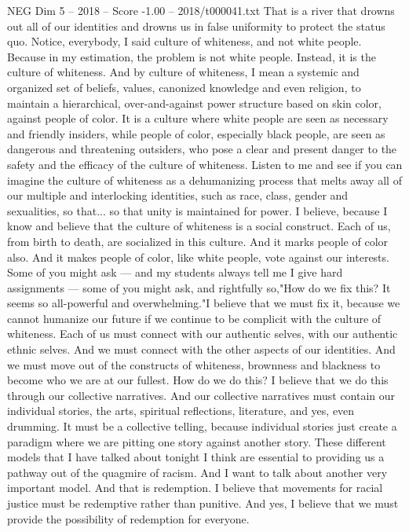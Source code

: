 \begin{textsample}{NEG Dim 5 – 2018 – Score -1.00 – 2018/t000041.txt}
That is a river that drowns out all of our identities and drowns us in false uniformity to protect the status quo.
Notice, everybody, I said culture of whiteness, and not white people.
Because in my estimation, the problem is not white people.
Instead, it is the culture of whiteness.
And by culture of whiteness, I mean a systemic and organized set of beliefs, values, canonized knowledge and even religion, to maintain a hierarchical, over-and-against power structure based on skin color, against people of color.
It is a culture where white people are seen as necessary and friendly insiders, while people of color, especially black people, are seen as dangerous and threatening outsiders, who pose a clear and present danger to the safety and the efficacy of the culture of whiteness.
Listen to me and see if you can imagine the culture of whiteness as a dehumanizing process that melts away all of our multiple and interlocking identities, such as race, class, gender and sexualities, so that... so that unity is maintained for power.
I believe, because I know and believe that the culture of whiteness is a social construct.
Each of us, from birth to death, are socialized in this culture.
And it marks people of color also.
And it makes people of color, like white people, vote against our interests.
Some of you might ask — and my students always tell me I give hard assignments — some of you might ask, and rightfully so,"How do we fix this?
It seems so all-powerful and overwhelming."I believe that we must fix it, because we cannot humanize our future if we continue to be complicit with the culture of whiteness.
Each of us must connect with our authentic selves, with our authentic ethnic selves.
And we must connect with the other aspects of our identities.
And we must move out of the constructs of whiteness, brownness and blackness to become who we are at our fullest.
How do we do this?
I believe that we do this through our collective narratives.
And our collective narratives must contain our individual stories, the arts, spiritual reflections, literature, and yes, even drumming.
It must be a collective telling, because individual stories just create a paradigm where we are pitting one story against another story.
These different models that I have talked about tonight I think are essential to providing us a pathway out of the quagmire of racism.
And I want to talk about another very important model.
And that is redemption.
I believe that movements for racial justice must be redemptive rather than punitive.
And yes, I believe that we must provide the possibility of redemption for everyone.

\end{textsample}
